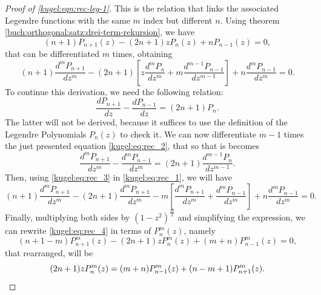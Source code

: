 \begin{proof}[Proof of \eqref{kugel:eqn:rec-leg-1}]
  This is the relation that links the associated Legendre functions with the
  same $m$ index but different $n$. Using theorem
  \ref{buch:orthogonal:satz:drei-term-rekursion}, we have 
  \begin{equation*}
    (n+1)P_{n+1}(z)-(2n+1)zP_n(z)+nP_{n-1}(z)=0,
  \end{equation*}
  that can be differentiated $m$ times, obtaining
  \begin{equation}
    \label{kugel:eq:rec_1}
    (n+1)\frac{d^mP_{n+1}}{dz^m}-(2n+1) \left[
      z \frac{d^m P_n}{dz^m}+ m\frac{d^{m-1}P_{n-1}}{dz^{m-1}}
    \right] + n\frac{d^m P_{n-1}}{dz^m} = 0.
  \end{equation}
  To continue this derivation, we need the following relation:
  \begin{equation}
    \label{kugel:eq:rec_2}
    \frac{dP_{n+1}}{dz} - \frac{dP_{n-1}}{dz} = (2n+1)P_n.
  \end{equation}
  The latter will not be derived, because it suffices to use the definition of
  the Legendre Polynomials $P_n(z)$ to check it.  We can now differentiate $m-1$
  times the just presented equation \eqref{kugel:eq:rec_2}, that so that is
  becomes
  \begin{equation}
    \label{kugel:eq:rec_3}
    \frac{d^mP_{n+1}}{dz^m} - \frac{d^mP_{n-1}}{dz^m}
    = (2n+1)\frac{d^{m-1}P_n}{dz^{m-1}}.
  \end{equation}
  Then, using \eqref{kugel:eq:rec_3} in \eqref{kugel:eq:rec_1}, we will
  have
  \begin{equation}
    \label{kugel:eq:rec_4}
    (n+1)\frac{d^mP_{n+1}}{dz^m}
      - (2n+1)\frac{d^mP_{n+1}}{dz^m}
      - m\left[\frac{d^m P_{n+1}}{dz^m}
      + \frac{d^{m}P_{n-1}}{dz^m}\right]
      + n\frac{d^m P_{n-1}}{dz^m}=0.
  \end{equation}
  Finally, multiplying both sides by $(1-z^2)^{\frac{m}{2}}$ and simplifying the
  expression, we can rewrite \eqref{kugel:eq:rec_4} in terms of $P^m_n(z)$,
  namely
  \begin{equation*}
    (n+1-m)P^m_{n+1}(z)-(2n+1)zP^m_n(z)+(m+n)P^m_{n-1}(z)=0,
  \end{equation*}
  that rearranged, will be
  \begin{equation*}
    (2n+1) z P^m_n(z)= (m+n) P^m_{n-1}(z) + (n-m+1) P^m_{n+1}(z).
    \qedhere
  \end{equation*}
\end{proof}

